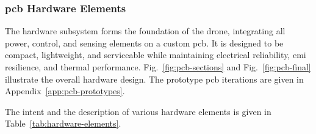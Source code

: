 \subsubsection{\gls{pcb} Hardware Elements}

The hardware subsystem forms the foundation of the drone, integrating all power, control, and sensing elements on a custom \gls{pcb}. It is designed to be compact, lightweight, and serviceable while maintaining electrical reliability, \gls{emi} resilience, and thermal performance. Fig.~\ref{fig:pcb-sections} and Fig.~\ref{fig:pcb-final} illustrate the overall hardware design. The prototype \gls{pcb} iterations are given in Appendix~\ref{app:pcb-prototypes}. 

The intent and the description of various hardware elements is given in Table~\ref{tab:hardware-elements}.

